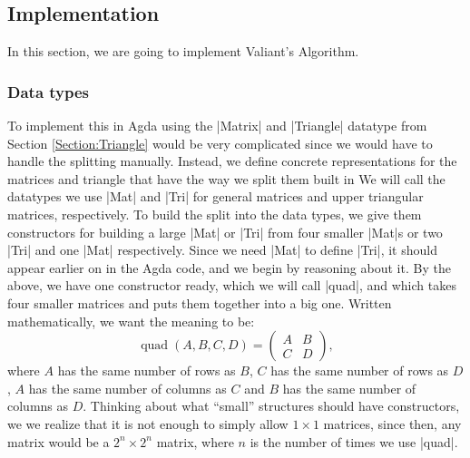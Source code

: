 \subsection{Implementation}
In this section, we are going to implement Valiant's Algorithm.
\subsubsection{Data types}
To implement this in Agda using the |Matrix| and |Triangle| datatype from Section \ref{Section:Triangle} would be very complicated since we would have to handle the splitting manually. Instead, we define concrete representations for the matrices and triangle that have the way we split them built in%
We will call the datatypes we use |Mat| and |Tri| for general matrices and upper triangular matrices, respectively.
To build the split into the data types, we give them constructors for building a large |Mat| or |Tri| from four smaller |Mat|s or two |Tri| and one |Mat| respectively. Since we need |Mat| to define |Tri|, it should appear earlier on in the Agda code, and we begin by reasoning about it. By the above, we have one constructor ready, which we will call |quad|, and which takes four smaller matrices and puts them together into a big one.  Written mathematically, we want the meaning to be:
\begin{equation}
\operatorname{quad}(A,B,C,D) = 
\begin{pmatrix} 
  A & B \\
  C & D
\end{pmatrix},
\end{equation}
where $A$ has the same number of rows as $B$, $C$ has the same number of rows as $D$, $A$ has the same number of columns as $C$ and $B$ has the same number of columns as $D$.
Thinking about what ``small'' structures should have constructors, we we realize that it is not enough to simply allow $1 \times 1$ matrices, since then, any matrix would be a $2^n \times 2^n$ matrix, where $n$ is the number of times we use |quad|. 

